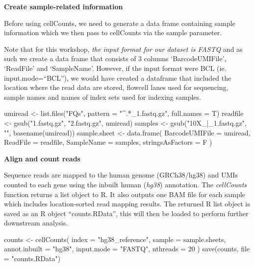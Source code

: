 \documentclass[
]{book}
\newenvironment{Shaded}{\begin{snugshade}}{\end{snugshade}}
\newcommand{\AttributeTok}[1]{\textcolor[rgb]{0.77,0.63,0.00}{#1}}
\newcommand{\DecValTok}[1]{\textcolor[rgb]{0.00,0.00,0.81}{#1}}
\newcommand{\FunctionTok}[1]{\textcolor[rgb]{0.00,0.00,0.00}{#1}}
\newcommand{\NormalTok}[1]{#1}
\newcommand{\OtherTok}[1]{\textcolor[rgb]{0.56,0.35,0.01}{#1}}
\newcommand{\StringTok}[1]{\textcolor[rgb]{0.31,0.60,0.02}{#1}}
\begin{document}
\textbf{Create sample-related information}

Before using cellCounts, we need to generate a data frame containing sample information which we then pass to cellCounts via the sample parameter.

Note that for this workshop, \emph{the input format for our dataset is FASTQ} and as such we create a data frame that consists of 3 columns `BarcodeUMIFile', `ReadFile' and `SampleName'. However, if the input format were BCL (ie. input.mode=``BCL''), we would have created a dataframe that included the location where the read data are stored, flowcell lanes used for sequencing, sample names and names of index sets used for indexing samples.

\begin{Shaded}
\begin{Highlighting}[]
\NormalTok{umiread }\OtherTok{\textless{}{-}} \FunctionTok{list.files}\NormalTok{(}\StringTok{"FQs"}\NormalTok{,}
                      \AttributeTok{pattern =} \StringTok{"\^{}.*\_1.fastq.gz"}\NormalTok{,}
                      \AttributeTok{full.names =}\NormalTok{ T)}
\NormalTok{readfile }\OtherTok{\textless{}{-}} \FunctionTok{gsub}\NormalTok{(}\StringTok{"1.fastq.gz"}\NormalTok{, }\StringTok{"2.fastq.gz"}\NormalTok{, umiread)}
\NormalTok{samples }\OtherTok{\textless{}{-}} \FunctionTok{gsub}\NormalTok{(}\StringTok{"10X\_|\_1.fastq.gz"}\NormalTok{, }\StringTok{""}\NormalTok{, }\FunctionTok{basename}\NormalTok{(umiread))}
\NormalTok{sample.sheet }\OtherTok{\textless{}{-}}
  \FunctionTok{data.frame}\NormalTok{(}
    \AttributeTok{BarcodeUMIFile =}\NormalTok{ umiread,}
    \AttributeTok{ReadFile =}\NormalTok{ readfile,}
    \AttributeTok{SampleName =}\NormalTok{ samples,}
    \AttributeTok{stringsAsFactors =}\NormalTok{ F}
\NormalTok{  )}
\end{Highlighting}
\end{Shaded}

\textbf{Align and count reads}

Sequence reads are mapped to the human genome (GRCh38/hg38) and UMIs counted to each gene using the inbuilt human (\emph{hg38}) annotation. The \emph{cellCounts} function returns a list object to R. It also outputs one BAM file for each sample which includes location-sorted read mapping results. The returned R list object is saved as an R object ``counts.RData'', this will then be loaded to perform further downstream analysis.

\begin{Shaded}
\begin{Highlighting}[]
\NormalTok{counts }\OtherTok{\textless{}{-}}
  \FunctionTok{cellCounts}\NormalTok{(}
    \AttributeTok{index =} \StringTok{"hg38\_reference"}\NormalTok{,}
    \AttributeTok{sample =}\NormalTok{ sample.sheets,}
    \AttributeTok{annot.inbuilt =} \StringTok{"hg38"}\NormalTok{,}
    \AttributeTok{input.mode =} \StringTok{"FASTQ"}\NormalTok{,}
    \AttributeTok{nthreads =} \DecValTok{20}
\NormalTok{  )}
\FunctionTok{save}\NormalTok{(counts, }\AttributeTok{file =} \StringTok{"counts.RData"}\NormalTok{)}
\end{Highlighting}
\end{Shaded}
\end{document}

